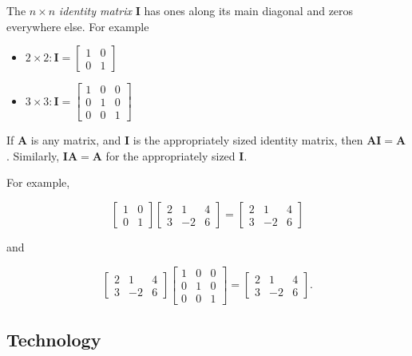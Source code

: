 \documentclass[
]{book}
\providecommand{\tightlist}{%
  \setlength{\itemsep}{0pt}\setlength{\parskip}{0pt}}
\theoremstyle{definition}
\theoremstyle{definition}
\theoremstyle{definition}
\theoremstyle{definition}
\theoremstyle{remark}
\begin{document}
The \(n\times n\) \emph{identity matrix} \(\mathbf{I}\) has ones along its main diagonal and zeros everywhere else. For example

\begin{itemize}
\tightlist
\item
  \(2\times 2:\mathbf{I}=\displaystyle{\begin{bmatrix}
    1 & 0 \\0 & 1\end{bmatrix}}\)
\item
  \(3\times 3:\mathbf{I}=\displaystyle{\begin{bmatrix}
    1 & 0 & 0\\0 & 1 & 0\\0 & 0 & 1
    \end{bmatrix}}\)
\end{itemize}

If \(\mathbf{A}\) is any matrix, and \(\mathbf{I}\) is the appropriately sized identity matrix, then \(\mathbf{AI}=\mathbf{A}\). Similarly, \(\mathbf{IA}=\mathbf{A}\) for the appropriately sized \(\mathbf{I}.\)

For example,

\[\begin{bmatrix}
    1 & 0 \\0 & 1\end{bmatrix} \begin{bmatrix} 2 & 1 & 4\\3 & -2 & 6\end{bmatrix}=\begin{bmatrix} 2 & 1 & 4\\3 & -2 & 6\end{bmatrix}\]

and

\[\begin{bmatrix} 2 & 1 & 4\\3 & -2 & 6\end{bmatrix}\begin{bmatrix}
    1 & 0 & 0\\0 & 1 & 0\\0 & 0 & 1
    \end{bmatrix}=\begin{bmatrix} 2 & 1 & 4\\3 & -2 & 6\end{bmatrix}.\]

\subsection*{Technology}\label{technology}
\end{document}
